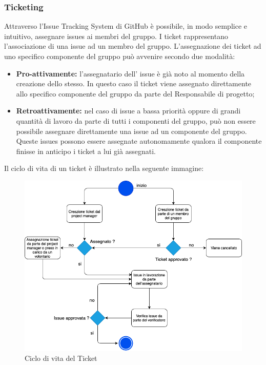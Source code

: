                 \subsubsection{Ticketing}
                    Attraverso l'Issue Tracking System di GitHub è possibile, in modo semplice e intuitivo, assegnare issues ai membri del gruppo.
                    I ticket rappresentano l’associazione di una issue ad un membro del gruppo. L’assegnazione dei ticket ad uno specifico componente del gruppo può avvenire secondo due modalità:
                    \begin{itemize}
                        \item \textbf{Pro-attivamente:} l’assegnatario dell' issue è già noto al momento della creazione dello stesso. In questo caso il ticket viene assegnato direttamente allo specifico componente del gruppo da parte del Responsabile di progetto;
                        \item \textbf{Retroattivamente:} nel caso di issue a bassa priorità oppure di grandi quantità di lavoro da parte di tutti i componenti del gruppo, può non essere possibile assegnare direttamente una issue ad un componente del gruppo. Queste issues possono essere assegnate autonomamente qualora il componente finisse in anticipo i ticket a lui già assegnati.\newline
                    \end{itemize}\clearpage
                    Il ciclo di vita di un ticket è illustrato nella seguente immagine:\newline
                    \begin{figure}[!htbp]
                    	    	\centering                 	    	\includegraphics[scale=0.7]{lifeCycleTicket.png}
                    	    	\caption{Ciclo di vita del Ticket}
                    	    \end{figure}
                    
